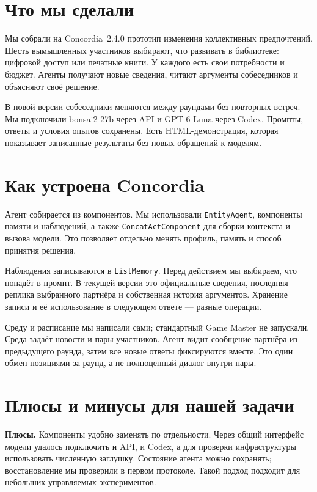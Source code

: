 \documentclass[12pt,a4paper]{article}
\begin{document}
\section{Что мы сделали}

Мы собрали на Concordia~2.4.0 прототип изменения коллективных предпочтений.
Шесть вымышленных участников выбирают, что развивать в библиотеке:
цифровой доступ или печатные книги. У каждого есть свои потребности и бюджет.
Агенты получают новые сведения, читают аргументы собеседников и объясняют
своё решение.

В новой версии собеседники меняются между раундами без повторных встреч.
Мы подключили bonsai2-27b через API и GPT-6-Luna через Codex.
Промпты, ответы и условия опытов сохранены. Есть HTML-демонстрация,
которая показывает записанные результаты без новых обращений к моделям.

\section{Как устроена Concordia}

Агент собирается из компонентов. Мы использовали \texttt{EntityAgent},
компоненты памяти и наблюдений, а также \texttt{ConcatActComponent}
для сборки контекста и вызова модели. Это позволяет отдельно менять
профиль, память и способ принятия решения.

Наблюдения записываются в \texttt{ListMemory}. Перед действием мы выбираем,
что попадёт в промпт. В текущей версии это официальные сведения,
последняя реплика выбранного партнёра и собственная история аргументов.
Хранение записи и её использование в следующем ответе --- разные операции.

Среду и расписание мы написали сами; стандартный Game Master не запускали.
Среда задаёт новости и пары участников. Агент видит сообщение партнёра
из предыдущего раунда, затем все новые ответы фиксируются вместе.
Это один обмен позициями за раунд, а не полноценный диалог внутри пары.

\section{Плюсы и минусы для нашей задачи}

\textbf{Плюсы.} Компоненты удобно заменять по отдельности.
Через общий интерфейс модели удалось подключить и API, и Codex,
а для проверки инфраструктуры использовать численную заглушку.
Состояние агента можно сохранять; восстановление мы проверили в первом
протоколе. Такой подход подходит для небольших управляемых экспериментов.
\end{document}
